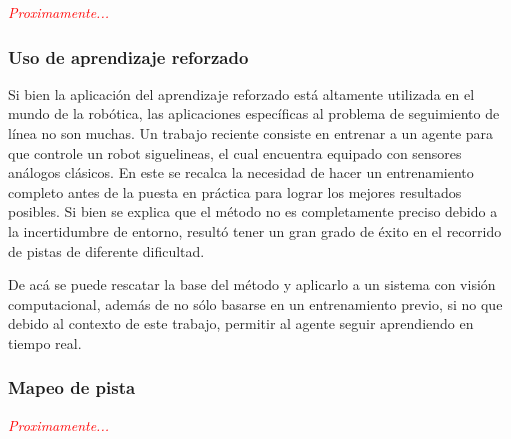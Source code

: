 \textit{\textcolor{red}{Proximamente...}}

\subsubsection{Uso de aprendizaje reforzado}
Si bien la aplicación del aprendizaje reforzado está altamente utilizada en el mundo de la robótica, las aplicaciones específicas al problema de seguimiento de línea no son muchas. Un trabajo reciente \cite{analogrl} consiste en entrenar a un agente para que controle un robot siguelineas, el cual encuentra equipado con sensores análogos clásicos. En este se recalca la necesidad de hacer un entrenamiento completo antes de la puesta en práctica para lograr los mejores resultados posibles. Si bien se explica que el método no es completamente preciso debido a la incertidumbre de entorno, resultó tener un gran grado de éxito en el recorrido de pistas de diferente dificultad. 

De acá se puede rescatar la base del método y aplicarlo a un sistema con visión computacional, además de no sólo basarse en un entrenamiento previo, si no que debido al contexto de este trabajo, permitir al agente seguir aprendiendo en tiempo real.

\subsubsection{Mapeo de pista}

\textit{\textcolor{red}{Proximamente...}}

